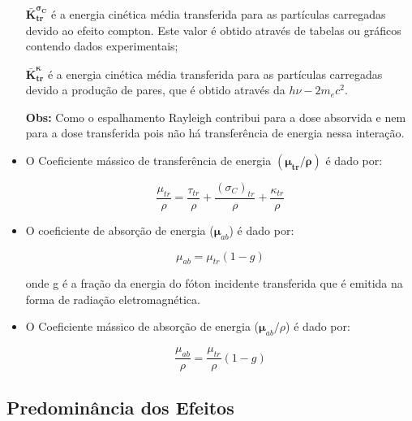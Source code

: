 \documentclass[11pt,a4paper]{article}
\begin{document}
\begin{itemize}
                \noindent $\mathbf{\bar{K}_{tr}^{\sigma_C}}$ é a energia cinética média transferida para as partículas carregadas devido ao efeito compton. Este valor é obtido através de tabelas ou gráficos contendo dados experimentais; 


                \noindent $\mathbf{\bar{K}_{tr}^{\kappa}}$ é a energia cinética média transferida para as partículas carregadas devido a produção de pares, que é obtido através da  $h\nu - 2m_ec^2$.


                \textbf{Obs:} Como o espalhamento Rayleigh  contribui para a dose absorvida e nem para a dose transferida pois não há transferência de energia nessa interação.

            \item O Coeficiente mássico de transferência de energia $(\mathbf{\mu_{tr}/\rho})$ é dado por:
            
                \begin{equation}
                    \frac{\mu_{tr}}{\rho} = \frac{\tau_{tr}}{\rho} + \frac{(\sigma_C)_{tr}}{\rho} + \frac{\kappa_{tr}}{\rho}
                \end{equation}

            
            \item O coeficiente de absorção de energia ($\mathbf{\mu}_{ab}$) é dado por:
            
                \begin{equation}
                    \mu_{ab} = \mu_{tr}(1 - g)
                \end{equation}

            \noindent onde g é a fração da energia do fóton incidente transferida que é emitida na forma de radiação eletromagnética. 

            \item O Coeficiente mássico de absorção de energia ($\mathbf{\mu}_{ab}/\rho$) é dado por:
            
                \begin{equation}
                    \frac{\mu_{ab}}{\rho} = \frac{\mu_{tr}}{\rho}(1 - g)
                \end{equation}

            \end{itemize}

        \subsection{Predominância dos Efeitos}
\end{document}
